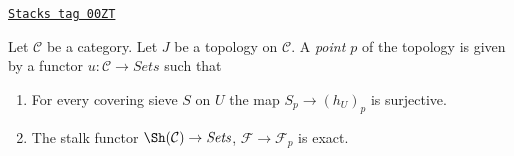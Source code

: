 \begin{definition}
\label{sites-definition-point-topology}
\href{https://stacks.math.columbia.edu/tag/00ZT}{\texttt{Stacks tag 00ZT}}

Let $\mathcal{C}$ be a category.
Let $J$ be a topology on $\mathcal{C}$.
A {\it point $p$} of the topology is given by a functor
$u : \mathcal{C} \to \textit{Sets}$ such that
\begin{enumerate}
\item For every covering sieve $S$ on $U$ the map
$S_p \to (h_U)_p$ is surjective.
\item The stalk functor $\Sh(\mathcal{C}) \to \textit{Sets}$,
$\mathcal{F} \to \mathcal{F}_p$ is exact.
\end{enumerate}
\end{definition}



